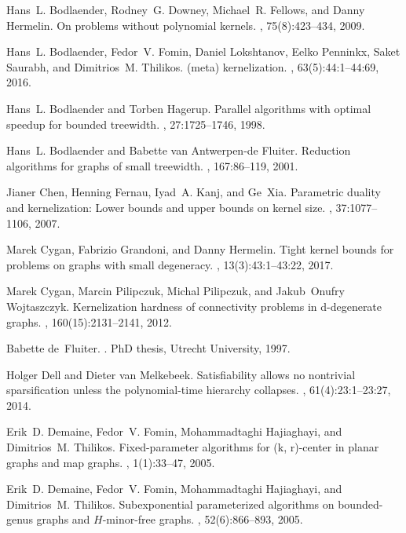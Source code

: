 \documentclass[11pt]{article}
\begin{document}
\begin{thebibliography}{10}
Hans~L. Bodlaender, Rodney~G. Downey, Michael~R. Fellows, and Danny Hermelin.
\newblock On problems without polynomial kernels.
, 75(8):423--434, 2009.

Hans~L. Bodlaender, Fedor~V. Fomin, Daniel Lokshtanov, Eelko Penninkx, Saket
  Saurabh, and Dimitrios~M. Thilikos.
\newblock (meta) kernelization.
, 63(5):44:1--44:69, 2016.

Hans~L. Bodlaender and Torben Hagerup.
\newblock Parallel algorithms with optimal speedup for bounded treewidth.
, 27:1725--1746, 1998.

Hans~L. Bodlaender and Babette van Antwerpen-de Fluiter.
\newblock Reduction algorithms for graphs of small treewidth.
, 167:86--119, 2001.

Jianer Chen, Henning Fernau, Iyad~A. Kanj, and Ge~Xia.
\newblock Parametric duality and kernelization: Lower bounds and upper bounds
  on kernel size.
, 37:1077--1106, 2007.

Marek Cygan, Fabrizio Grandoni, and Danny Hermelin.
\newblock Tight kernel bounds for problems on graphs with small degeneracy.
, 13(3):43:1--43:22, 2017.

Marek Cygan, Marcin Pilipczuk, Michal Pilipczuk, and Jakub~Onufry Wojtaszczyk.
\newblock Kernelization hardness of connectivity problems in d-degenerate
  graphs.
, 160(15):2131--2141, 2012.

Babette de~Fluiter.
.
\newblock PhD thesis, Utrecht University, 1997.

Holger Dell and Dieter van Melkebeek.
\newblock Satisfiability allows no nontrivial sparsification unless the
  polynomial-time hierarchy collapses.
, 61(4):23:1--23:27, 2014.

Erik~D. Demaine, Fedor~V. Fomin, Mohammadtaghi Hajiaghayi, and Dimitrios~M.
  Thilikos.
\newblock Fixed-parameter algorithms for (k, r)-center in planar graphs and map
  graphs.
, 1(1):33--47, 2005.

Erik~D. Demaine, Fedor~V. Fomin, Mohammadtaghi Hajiaghayi, and Dimitrios~M.
  Thilikos.
\newblock Subexponential parameterized algorithms on bounded-genus graphs and
  {$H$}-minor-free graphs.
, 52(6):866--893, 2005.


\end{thebibliography}
\end{document}
